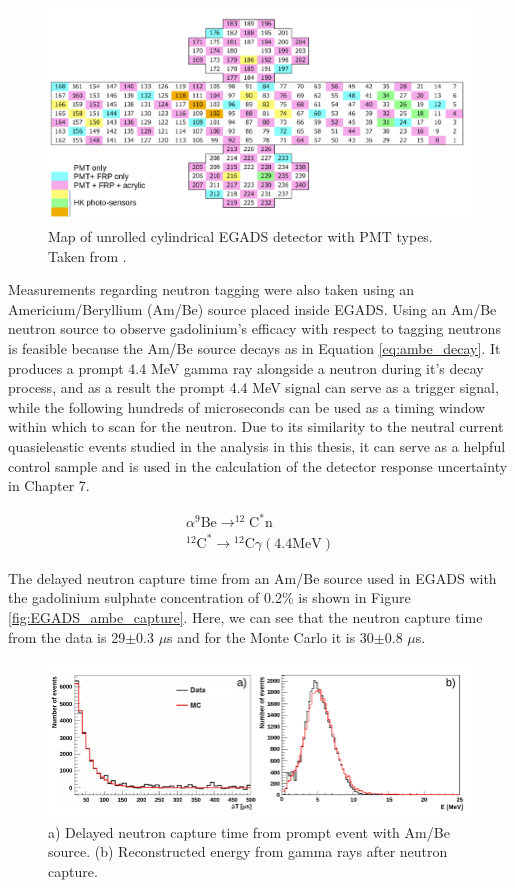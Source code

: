 \begin{figure}[H]
    \includegraphics[width=\textwidth]{Figures/egads_pmt_map.png}
\caption{Map of unrolled cylindrical EGADS detector with PMT types. Taken from \cite{martiEvaluationGadoliniumAction2020a}.}
\label{fig:EGADS_PMT}
\end{figure}

Measurements regarding neutron tagging were also taken using an Americium/Beryllium (Am/Be) source placed inside EGADS. Using an Am/Be neutron source to observe gadolinium's efficacy with respect to tagging neutrons is feasible because the Am/Be source decays as in Equation \ref{eq:ambe_decay}. It produces a prompt 4.4 MeV gamma ray alongside a neutron during it's decay process, and as a result the prompt 4.4 MeV signal can serve as a trigger signal, while the following hundreds of microseconds can be used as a timing window within which to scan for the neutron. Due to its similarity to the neutral current quasieleastic events studied in the analysis in this thesis, it can serve as a helpful control sample and is used in the calculation of the detector response uncertainty in Chapter 7.

\begin{equation}
\begin{array}{c}
\alpha^{9} \mathrm{Be} \longrightarrow^{12} \mathrm{C}^{*} \mathrm{n} \\
{ }^{12} \mathrm{C}^{*} \longrightarrow{ }^{12} \mathrm{C} \gamma(4.4 \mathrm{MeV})
\end{array}
\label{eq:ambe_decay}
\end{equation}

The delayed neutron capture time from an Am/Be source used in EGADS with the gadolinium sulphate concentration of 0.2\% is shown in Figure \ref{fig:EGADS_ambe_capture}. Here, we can see that the neutron capture time from the data is 29$\pm$0.3 $\mu$s and for the Monte Carlo it is 30$\pm$0.8 $\mu$s.

\begin{figure}[H]
    \includegraphics[width=\textwidth]{Figures/egads_ambe.png}
\caption{a) Delayed neutron capture time from prompt event with Am/Be source. (b) Reconstructed energy from gamma rays after neutron capture.}
\label{fig:EGADS_PMT}
\end{figure}

